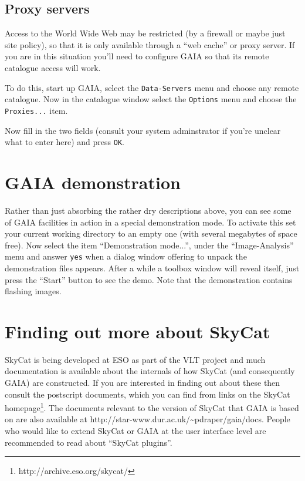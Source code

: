 \documentclass[twoside,11pt]{article}
\newcommand{\htmladdnormallinkfoot}[2]{#1\footnote{#2}}
\newcommand{\htmladdnormallink}[2]{#1}
\newcommand{\xlabel}[1]{}
\renewcommand{\_}{\texttt{\symbol{95}}}
\newcommand{\mytt}[1]{{\tt{#1}}}
\begin{document}
\subsection{\xlabel{proxy_servers}Proxy servers}
Access to the World Wide Web may be restricted (by a firewall or maybe
just site policy), so that it is only available through a ``web
cache'' or proxy server. If you are in this situation you'll need to
configure GAIA so that its remote catalogue access will work.

To do this, start up GAIA, select the \mytt{Data-Servers} menu and
choose any remote catalogue. Now in the catalogue window select the
\mytt{Options} menu and choose the \mytt{Proxies...} item.

Now fill in the two fields (consult your system adminstrator if you're
unclear what to enter here) and press \mytt{OK}.

\section{\xlabel{gaia_demonstration}GAIA demonstration}
Rather than just absorbing the rather dry descriptions above, you can
see some of GAIA facilities in action in a special demonstration
mode. To activate this set your current working directory to an empty
one (with several megabytes of space free). Now select the item
``Demonstration mode...'', under the ``Image-Analysis'' menu and
answer \mytt{yes} when a dialog window offering to unpack the
demonstration files appears. After a while a toolbox window will
reveal itself, just press the ``Start'' button to see the demo. Note
that the demonstration contains flashing images.

\section{\xlabel{finding_out_more_about_skycat}Finding out more about SkyCat}
\htmladdnormallink{SkyCat}{http://archive.eso.org/skycat/} is being
developed at \htmladdnormallink{ESO}{http://www.eso.org/} as part of
the \htmladdnormallink{VLT}{http://www.eso.org/vlt/} project and much
documentation is available about the internals of how SkyCat (and
consequently GAIA) are constructed. If you are interested in finding
out about these then consult the postscript documents, which you can
find from links on the \htmladdnormallinkfoot{SkyCat
homepage}{http://archive.eso.org/skycat/}. The documents relevant to
the version of SkyCat that GAIA is based on are also available at
\htmladdnormallink{http://star-www.dur.ac.uk/\~{}pdraper/gaia/docs}
{http://star-www.dur.ac.uk/~pdraper/gaia/docs}. People who would like
to extend SkyCat or GAIA at the user interface level are recommended
to read about ``SkyCat plugins''.
\end{document}
